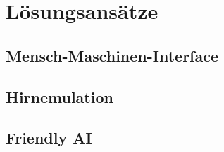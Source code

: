 \chapter{Lösungsansätze}
\section{Mensch-Maschinen-Interface}
\section{Hirnemulation}
\section{Friendly AI}



